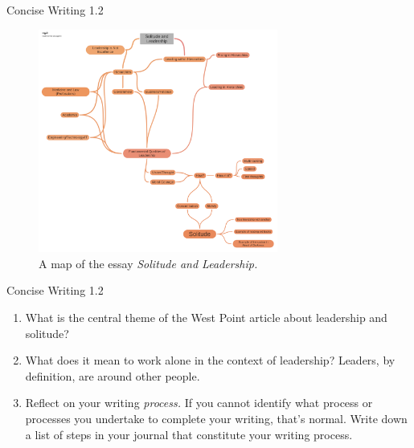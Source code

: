 \documentclass{beamer}
\begin{document}
\begin{frame}{Concise Writing 1.2}
\begin{figure}
\includegraphics[width=0.7\textwidth]{figures/Solitude_and_Leadership.pdf}
\caption{\label{fig:leadership}  A map of the essay \textit{Solitude and Leadership.}}
\end{figure}
\end{frame}

\begin{frame}{Concise Writing 1.2}
\begin{enumerate}
\item What is the central theme of the West Point article about leadership and solitude?
\item What does it mean to work alone in the context of leadership?  Leaders, by definition, are around other people.
\item Reflect on your writing \textit{process.}  If you cannot identify what process or processes you undertake to complete your writing, that's normal.  Write down a list of steps in your journal that constitute your writing process.
\end{enumerate}
\end{frame}
\end{document}
